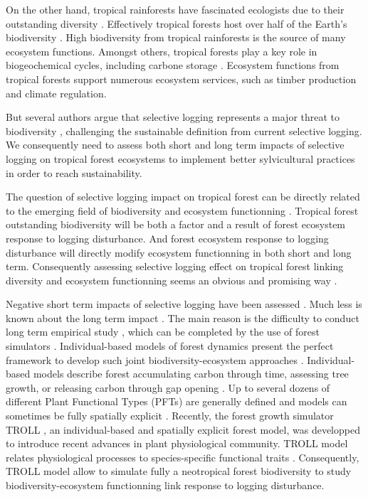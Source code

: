 \documentclass[12pt,]{article}
\theoremstyle{definition}
\theoremstyle{definition}
\theoremstyle{remark}
\begin{document}
On the other hand, tropical rainforests have fascinated ecologists due
to their outstanding diversity \citep{connell_diversity_1978}.
Effectively tropical forests host over half of the Earth's biodiversity
\citep{Scheffers2012}. High biodiversity from tropical rainforests is
the source of many ecosystem functions. Amongst others, tropical forests
play a key role in biogeochemical cycles, including carbone storage
\citep{Lewis2004}. Ecosystem functions from tropical forests support
numerous ecosystem services, such as timber production and climate
regulation.

But several authors argue that selective logging represents a major
threat to biodiversity
\citep{Carreno-Rocabado2012, DeAvila2015, Gibson2013, Martin2015, Zimmerman2012},
challenging the sustainable definition from current selective logging.
We consequently need to assess both short and long term impacts of
selective logging on tropical forest ecosystems to implement better
sylvicultural practices in order to reach sustainability.

The question of selective logging impact on tropical forest can be
directly related to the emerging field of biodiversity and ecosystem
functionning \citep{Loreau2000}. Tropical forest outstanding
biodiversity will be both a factor and a result of forest ecosystem
response to logging disturbance. And forest ecosystem response to
logging disturbance will directly modify ecosystem functionning in both
short and long term. Consequently assessing selective logging effect on
tropical forest linking diversity and ecosystem functionning seems an
obvious and promising way \citep{Loreau2010}.

Negative short term impacts of selective logging have been assessed
\citetext{\citealp{Carreno-Rocabado2012}; \citealp{DeAvila2015}; \citealp[but
see][]{Martin2015}}. Much less is known about the long term impact
\citep{Osazuwa-Peters2015}. The main reason is the difficulty to conduct
long term empirical study \citep[but see][]{Herault2010}, which can be
completed by the use of forest simulators
\citep{Huth2004, Khler2004, Ruger2008, Tietjen2006}. Individual-based
models of forest dynamics present the perfect framework to develop such
joint biodiversity-ecosystem approaches \citep{Li}. Individual-based
models describe forest accumulating carbon through time, assessing tree
growth, or releasing carbon through gap opening \citep{Bugmann2001}. Up
to several dozens of different Plant Functional Types (PFTs) are
generally defined and models can sometimes be fully spatially explicit
\citep{Pacala1996}. Recently, the forest growth simulator TROLL
\citep{Chave1999}, an individual-based and spatially explicit forest
model, was developped to introduce recent advances in plant
physiological community. TROLL model relates physiological processes to
species-specific functional traits \citep{Li}. Consequently, TROLL model
allow to simulate fully a neotropical forest biodiversity to study
biodiversity-ecosystem functionning link response to logging
disturbance.
\end{document}
